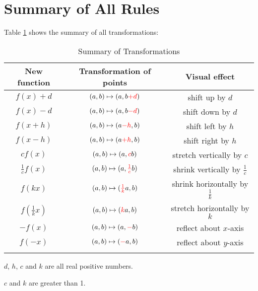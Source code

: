 \section{Summary of All Rules}
Table \ref{tab:tranform} shows the summary of all transformations:
\renewcommand{\arraystretch}{2}
\begin{table}[ht]
  \begin{threeparttable}
    \centering
    \caption{Summary of Transformations}
    \label{tab:tranform}
    \begin{tabular}{|c||c||c|}
    \Xhline{2\arrayrulewidth}
   New function  & Transformation of points & Visual effect \\ \hline
    $f(x)+d$ &  $(a,b) \mapsto (a,b\textcolor{red}{+d})$ &  shift up by $d$ \\
    \hline
     $f(x)-d$ &  $(a,b) \mapsto (a,b\textcolor{red}{-d})$ &  shift down by $d$ \\
    \hline    
    $f(x+h)$ &  $(a,b) \mapsto (a\textcolor{red}{-h},b)$ &  shift left by $h$ \\
    \hline  
    $f(x-h)$ &  $(a,b) \mapsto (a\textcolor{red}{+h},b)$ &  shift right by $h$ \\
    \hline\hline
    $cf(x)$ & $(a,b) \mapsto (a,\textcolor{red}{c}b)$ & stretch vertically by $c$ \\
    \hline 
    ${\textstyle \frac{1}{c}}f(x)$ & $(a,b) \mapsto (a,\textcolor{red}{{\textstyle \frac{1}{c}}}b)$ & shrink vertically by $\textstyle \frac{1}{c}$ \\
    \hline 
    $f(kx)$ & $(a,b) \mapsto (\textcolor{red}{{\textstyle \frac{1}{k}}}a,b)$ & shrink horizontally by $\textstyle \frac{1}{k}$ \\
    \hline 
    $f({\textstyle \frac{1}{k}}x)$ & $(a,b) \mapsto (\textcolor{red}{k}a,b)$ & stretch horizontally by $k$ \\
    \hline\hline
    $-f(x)$ & $(a,b) \mapsto (a, \textcolor{red}{-}b)$ & reflect about $x$-axis \\
    \hline
    $f(-x)$ & $(a,b) \mapsto (\textcolor{red}{-}a, b)$ & reflect about $y$-axis \\
    \Xhline{2\arrayrulewidth}
    \end{tabular}
    \begin{tablenotes}
      \small
      \item[\dag] $d$, $h$, $c$ and $k$ are all real positive numbers.
      \item[\dag \dag] $c$ and $k$ are greater than 1.
    \end{tablenotes}
    \end{threeparttable}

\end{table}